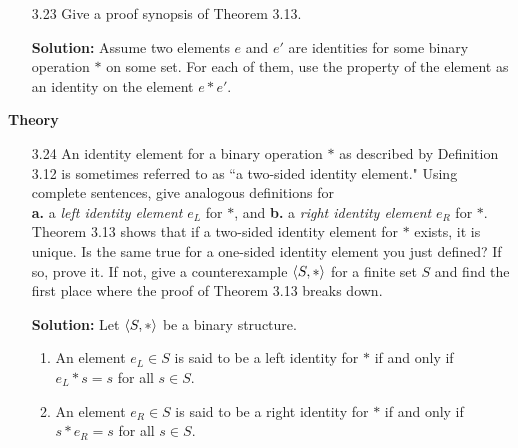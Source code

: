 \begin{enumerate}
   \item[3.23] Give a proof synopsis of Theorem 3.13.

      \textbf{Solution:} Assume two elements $e$ and $e'$ are identities for 
      some binary operation $*$ on some set. For each of them, use the property 
      of the element as an identity on the element $e * e'$.
\end{enumerate}
         

\noindent \textbf{Theory}

\begin{enumerate}
   \item[3.24] An identity element for a binary operation $*$ as described by
               Definition 3.12 is sometimes referred to as ``a two-sided 
               identity element." Using complete sentences, give analogous
               definitions for \\
               \textbf{a.} a \textit{left identity element} $e_L$ for $*$, and
               \qquad\qquad
               \textbf{b.} a \textit{right identity element} $e_R$ for $*$. \\
               Theorem 3.13 shows that if a two-sided identity element for $*$
               exists, it is unique. Is the same true for a one-sided identity
               element you just defined? If so, prove it. If not, give a
               counterexample $\langle S, * \rangle$ for a finite set $S$ and find the
               first place where the proof of Theorem 3.13 breaks down.

      \textbf{Solution:} Let $\langle S, * \rangle$ be a binary structure.

      \begin{enumerate}
         \item An element $e_L \in S$ is said to be a left identity for $*$ if
               and only if $e_L * s = s$ for all $s \in S$.
         \item An element $e_R \in S$ is said to be a right identity for $*$ if
               and only if $s * e_R = s$ for all $s \in S$.
      \end{enumerate}


\end{enumerate}
